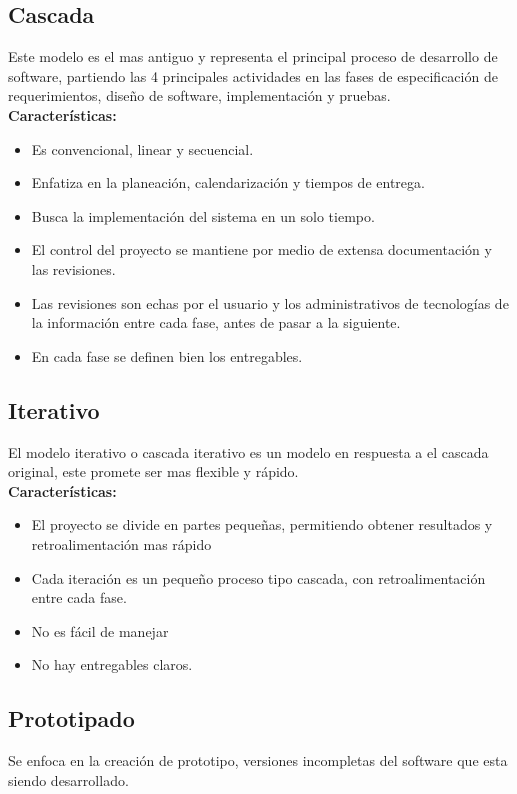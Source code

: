 \documentclass[spanish,12pt,letterpapper]{article}
\begin{document}
	\subsection{Cascada}
	Este modelo es el mas antiguo y representa el principal proceso de desarrollo de software, partiendo las 4 principales actividades en las fases de especificación de requerimientos, diseño de software, implementación y pruebas.\\ 
	
	\textbf{Características:}
	\begin{itemize}
	\item Es convencional, linear y secuencial.
	\item Enfatiza en la planeación, calendarización y tiempos de entrega.
	\item Busca la implementación del sistema en un solo tiempo.
	\item El control del proyecto se mantiene por medio de extensa documentación y las revisiones.
	\item Las revisiones son echas por el usuario y los administrativos de tecnologías de la información entre cada fase, antes de pasar a la siguiente.
	\item En cada fase se definen bien los entregables.
	\end{itemize}
	
	\subsection{Iterativo}
	El modelo iterativo o cascada iterativo es un modelo en respuesta a el cascada original, este promete ser mas flexible y rápido.\\
	
	\textbf{Características:}
	\begin{itemize}
	\item El proyecto se divide en partes pequeñas, permitiendo obtener resultados y retroalimentación mas rápido
	\item Cada iteración es un pequeño proceso tipo cascada, con retroalimentación entre cada fase.
	\item No es fácil de manejar
	\item No hay entregables claros.
	\end{itemize}
	
	\subsection{Prototipado}
	Se enfoca en la creación de prototipo, versiones incompletas del software que esta siendo desarrollado.\\
	
\end{document}
